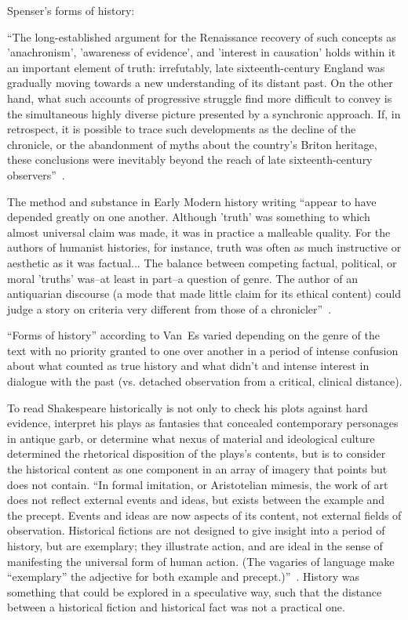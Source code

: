 Spenser's forms of history:

``The long-established argument for the Renaissance recovery of such concepts as 'anachronism', 'awareness of evidence', and 'interest in causation' holds within it an important element of truth: irrefutably, late sixteenth-century England was gradually moving towards a new understanding of its distant past. On the other hand, what such accounts of progressive struggle find more difficult to convey is the simultaneous highly diverse picture presented by a synchronic approach. If, in retrospect, it is possible to trace such developments as the decline of the chronicle, or the abandonment of myths about the country's Briton heritage, these conclusions were inevitably beyond the reach of late sixteenth-century observers''~\cite[8]{van_es_spensers_2002}.

The method and substance in Early Modern history writing ``appear to have depended greatly on one another. Although 'truth' was something to which almost universal claim was made, it was in practice a malleable quality. For the authors of humanist histories, for instance, truth was often as much instructive or aesthetic as it was factual... The balance between competing factual, political, or moral 'truths' was--at least in part--a question of genre. The author of an antiquarian discourse (a mode that made little claim for its ethical content) could judge a story on criteria very different from those of a chronicler''~\cite[12--13]{van_es_spensers_2002}.

``Forms of history'' according to Van~Es varied depending on the genre of the text with no priority granted to one over another in a period of intense confusion about what counted as true history and what didn't and intense interest in dialogue with the past (vs. detached observation from a critical, clinical distance).

To read Shakespeare historically is not only to check his plots against hard evidence, interpret his plays as fantasies that concealed contemporary personages in antique garb, or determine what nexus of material and ideological culture determined the rhetorical disposition of the plays's contents, but is to consider the historical content as one component in an array of imagery that points but does not contain. ``In formal imitation, or Aristotelian mimesis, the work of art does not reflect external events and ideas, but exists between the example and the precept. Events and ideas are now aspects of its content, not external fields of observation. Historical fictions are not designed to give insight into a period of history, but are exemplary; they illustrate action, and are ideal in the sense of manifesting the universal form of human action. (The vagaries of language make ``exemplary'' the adjective for both example and precept.)''~\cite[84]{frye_anatomy_2000}. History was something that could be explored in a speculative way, such that the distance between a historical fiction and historical fact was not a practical one.

